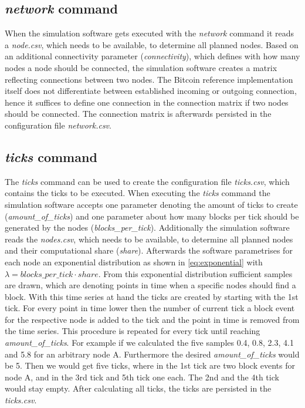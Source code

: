 \subsection{\textit{network} command} \label{chap:network_command}

When the simulation software gets executed with the \textit{network} command it reads a \textit{node.csv}, which needs to be available, to determine all planned nodes.
Based on an additional connectivity parameter (\textit{connectivity}), which defines with how many nodes a node should be connected, the simulation software creates a matrix reflecting connections between two nodes.
The Bitcoin reference implementation itself does not differentiate between established incoming or outgoing connection, hence it suffices to define one connection in the connection matrix if two nodes should be connected.
The connection matrix is afterwards persisted in the configuration file \textit{network.csv}.

\subsection{\textit{ticks} command} \label{chap:ticks_command}

The \textit{ticks} command can be used to create the configuration file \textit{ticks.csv}, which contains the ticks to be executed.
When executing the \textit{ticks} command the simulation software accepts one parameter denoting the amount of ticks to create (\textit{amount\_of\_ticks}) and one parameter about how many blocks per tick should be generated by the nodes (\textit{blocks\_per\_tick}).
Additionally the simulation software reads the \textit{nodes.csv}, which needs to be available, to determine all planned nodes and their computational share (\textit{share}).
Afterwards the software parametrises for each node an exponential distribution as shown in \ref{eq:exponential} with $\lambda = blocks\_per\_tick \cdot share$.
From this exponential distribution sufficient samples are drawn, which are denoting points in time when a specific nodes should find a block.
With this time series at hand the ticks are created by starting with the 1st tick.
For every point in time lower then the number of current tick a block event for the respective node is added to the tick and the point in time is removed from the time series.
This procedure is repeated for every tick until reaching \textit{amount\_of\_ticks}.
For example if we calculated the five samples 0.4, 0.8, 2.3, 4.1 and 5.8 for an arbitrary node A.
Furthermore the desired \textit{amount\_of\_ticks} would be 5.
Then we would get five ticks, where in the 1st tick are two block events for node A, and in the 3rd tick  and 5th tick one each.
The 2nd and the 4th tick would stay empty. After calculating all ticks, the ticks are persisted in the \textit{ticks.csv}.

